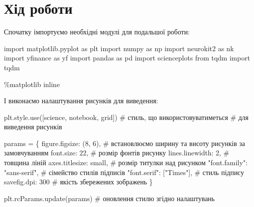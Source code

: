 \documentclass[
  letterpaper,
]{report}
\newenvironment{Shaded}{\begin{snugshade}}{\end{snugshade}}
\newcommand{\CommentTok}[1]{\textcolor[rgb]{0.37,0.37,0.37}{#1}}
\newcommand{\DecValTok}[1]{\textcolor[rgb]{0.68,0.00,0.00}{#1}}
\newcommand{\ImportTok}[1]{\textcolor[rgb]{0.00,0.46,0.62}{#1}}
\newcommand{\NormalTok}[1]{\textcolor[rgb]{0.00,0.23,0.31}{#1}}
\newcommand{\OperatorTok}[1]{\textcolor[rgb]{0.37,0.37,0.37}{#1}}
\newcommand{\StringTok}[1]{\textcolor[rgb]{0.13,0.47,0.30}{#1}}
\begin{document}
\hypertarget{ux445ux456ux434-ux440ux43eux431ux43eux442ux438-3}{%
\section{Хід
роботи}\label{ux445ux456ux434-ux440ux43eux431ux43eux442ux438-3}}

Спочатку імпортуємо необхідні модулі для подальшої роботи:

\begin{Shaded}
\begin{Highlighting}[]
\ImportTok{import}\NormalTok{ matplotlib.pyplot }\ImportTok{as}\NormalTok{ plt }
\ImportTok{import}\NormalTok{ numpy }\ImportTok{as}\NormalTok{ np}
\ImportTok{import}\NormalTok{ neurokit2 }\ImportTok{as}\NormalTok{ nk}
\ImportTok{import}\NormalTok{ yfinance }\ImportTok{as}\NormalTok{ yf}
\ImportTok{import}\NormalTok{ pandas }\ImportTok{as}\NormalTok{ pd}
\ImportTok{import}\NormalTok{ scienceplots}
\ImportTok{from}\NormalTok{ tqdm }\ImportTok{import}\NormalTok{ tqdm}

\OperatorTok{\%}\NormalTok{matplotlib inline}
\end{Highlighting}
\end{Shaded}

І виконаємо налаштування рисунків для виведення:

\begin{Shaded}
\begin{Highlighting}[]
\NormalTok{plt.style.use([}\StringTok{\textquotesingle{}science\textquotesingle{}}\NormalTok{, }\StringTok{\textquotesingle{}notebook\textquotesingle{}}\NormalTok{, }\StringTok{\textquotesingle{}grid\textquotesingle{}}\NormalTok{]) }\CommentTok{\# стиль, що використовуватиметься}
                                               \CommentTok{\# для виведення рисунків}

\NormalTok{params }\OperatorTok{=}\NormalTok{ \{}
    \StringTok{\textquotesingle{}figure.figsize\textquotesingle{}}\NormalTok{: (}\DecValTok{8}\NormalTok{, }\DecValTok{6}\NormalTok{),         }\CommentTok{\# встановлюємо ширину та висоту рисунків за замовчуванням}
    \StringTok{\textquotesingle{}font.size\textquotesingle{}}\NormalTok{: }\DecValTok{22}\NormalTok{,                  }\CommentTok{\# розмір фонтів рисунку}
    \StringTok{\textquotesingle{}lines.linewidth\textquotesingle{}}\NormalTok{: }\DecValTok{2}\NormalTok{,             }\CommentTok{\# товщина ліній}
    \StringTok{\textquotesingle{}axes.titlesize\textquotesingle{}}\NormalTok{: }\StringTok{\textquotesingle{}small\textquotesingle{}}\NormalTok{,        }\CommentTok{\# розмір титулки над рисунком}
    \StringTok{"font.family"}\NormalTok{: }\StringTok{"sans{-}serif"}\NormalTok{,      }\CommentTok{\# сімейство стилів підписів }
    \StringTok{"font.serif"}\NormalTok{: [}\StringTok{"Times"}\NormalTok{],          }\CommentTok{\# стиль підпису}
    \StringTok{\textquotesingle{}savefig.dpi\textquotesingle{}}\NormalTok{: }\DecValTok{300}                \CommentTok{\# якість збережених зображень}
\NormalTok{\}}

\NormalTok{plt.rcParams.update(params)           }\CommentTok{\# оновлення стилю згідно налаштувань}
\end{Highlighting}
\end{Shaded}
\end{document}
